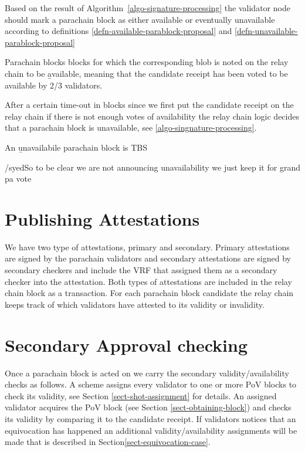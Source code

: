 Based on the result of Algorithm~\ref{algo-signature-processing} the validator node should mark a parachain block as either available or eventually unavailable according to definitions \ref{defn-available-parablock-proposal} and \ref{defn-unavailable-parablock-proposal}
\begin{definition}
  \label{defn-available-parablock-proposal}
        Parachain blocks blocks for which the corresponding blob is  noted on the relay chain to be {\b available}, meaning that the candidate receipt has been voted to be available by 2/3 validators.
\end{definition}

After a certain time-out in blocks since we first put the candidate receipt on the relay chain if there is not enough votes of availability the relay chain logic decides that a parachain block is unavailable, see \ref{algo-singnature-processing}.

\begin{definition}
  \label{defn-unavailable-parachain-block}
       An {\b unavailabile parachain block} is TBS
\end{definition}

/syed{}{So to be clear we are not announcing unavailability we just keep it for grand pa vote}

\section{Publishing Attestations}
\label{sect-publishing-attestations}
We have two type of attestations, primary and secondary. Primary attestations are signed by the parachain validators and secondary attestations are signed by secondary checkers and include the VRF that assigned them as a secondary checker into the attestation. Both types of attestations are included in the relay chain block as a transaction. For each parachain block candidate the relay chain keeps track of which validators have attested to its validity or invalidity.

\section{Secondary Approval checking}
\label{sect-approval-checking}
Once a parachain block is acted on we carry the secondary validity/availability checks as follows. A scheme assigns every validator to one or more PoV blocks to check its validity, see Section \ref{sect-shot-assignment} for details. An assigned validator acquires the PoV block (see Section \ref{sect-obtaining-block}) and checks its validity by comparing it to the candidate receipt. If validators notices that an equivocation has happened an additional validity/availability assignments will be made that is described in Section\ref{sect-equivocation-case}.

